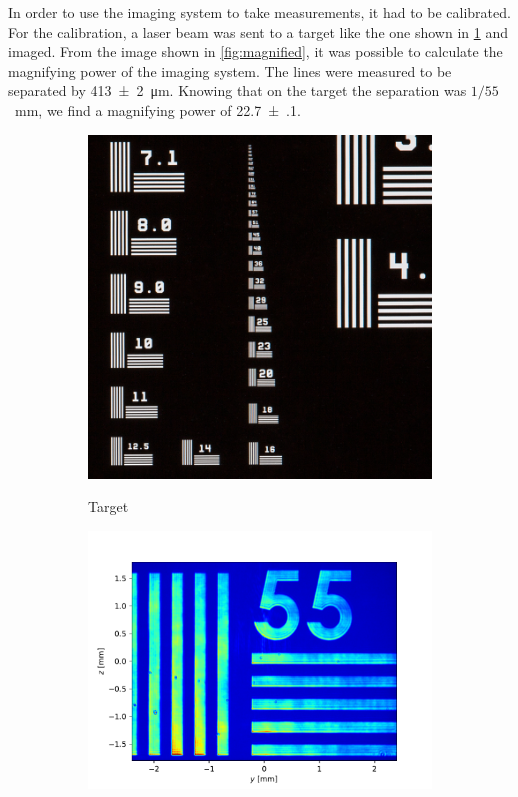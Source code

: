 In order to use the imaging system to take measurements, it had to be calibrated. For the calibration, a laser beam was sent to a target like the one shown in \cref{fig:target} and imaged. From the image shown in \cref{fig:magnified}, it was possible to calculate the magnifying power of the imaging system. The lines were measured to be separated by \SI{413(2)}{\micro\meter}. Knowing that on the target the separation was $1/55$~mm, we find a magnifying power of \SI{22.7(1)}{}.

\begin{figure}
    \begin{subfigure}[b]{0.35 \textwidth}
        \includegraphics[width=\textwidth]{chapters/chapter_3/figures/target.jpg}
        \\
        \caption{Target}
        \label{fig:target}
    \end{subfigure}
    \hfill
    \begin{subfigure}[b]{0.6\textwidth}
        \includegraphics[width=\textwidth]{chapters/chapter_3/figures/magnified}

\end{subfigure}
\end{figure}
